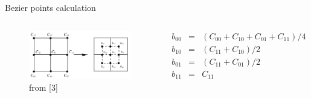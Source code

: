 \begin{frame}{Bezier points calculation}
\begin{columns}[c] %

	\vspace{5mm}
	\begin{figure}
	\includegraphics[width=\linewidth]{Pictures/BackupSlidesFitting/bezierPoints.png}
	\caption{from [3]}
	\end{figure}

	\vspace{-3mm}
	\begin{equation*}
	\begin{array}{lcl} 
	b_{00} & = & (C_{00} + C_{10} + C_{01} + C_{11})/4 \\ 
	b_{10} & = & (C_{11} + C_{10})/2 \\
	b_{01} & = & (C_{11} + C_{01})/2 \\
	b_{11} & = & C_{11}
	\end{array}
	\end{equation*}
	\end{columns}

\end{frame}